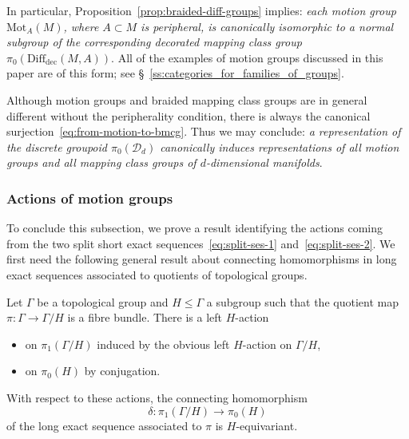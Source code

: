 \documentclass[AHL,Unicode,published]{cedram}
\newcommand{\Mot}{\mathrm{Mot}}
\newcommand{\rdec}{\mathrm{dec}}
\newcommand{\cD}{\mathcal{D}}
\newcommand{\diffdec}{\ensuremath{\mathrm{Diff}_{\rdec}}}
\renewcommand{\leq}{\leqslant}
\begin{document}
\begin{rema}[{Globality}]\label{rmk:globality}
In particular, Proposition~\ref{prop:braided-diff-groups} implies: \emph{each motion group $\Mot_{A}(M)$, where $A \subset M$ is peripheral, is canonically isomorphic to a normal subgroup of the corresponding decorated mapping class group $\pi_{0}(\diffdec(M,A))$}. All of the examples of motion groups discussed in this paper are of this form; see \S~\ref{ss:categories_for_families_of_groups}.

Although motion groups and braided mapping class groups are in general different without the peripherality condition, there is always the canonical surjection~\eqref{eq:from-motion-to-bmcg}. Thus we may conclude: \emph{a representation of the discrete groupoid $\pi_{0}(\cD_{d})$ canonically induces representations of all motion groups and all mapping class groups of $d$-dimensional manifolds}.
\end{rema}


\subsubsection{Actions of motion groups}\label{sss:actions}

To conclude this subsection, we prove a result identifying the actions coming from the two split short exact sequences~\eqref{eq:split-ses-1} and~\eqref{eq:split-ses-2}. We first need the following general result about connecting homomorphisms in long exact sequences associated to quotients of topological groups.

\begin{prop}\label{prop:equivariant-connecting-homomorphism}
Let $\Gamma$ be a topological group and $H \leq \Gamma$ a subgroup such that the quotient map $\pi \colon \Gamma \to \Gamma/H$ is a fibre bundle. There is a left $H$-action
\begin{itemize}
\item on $\pi_{1}(\Gamma/H)$ induced by the obvious left $H$-action on $\Gamma/H$,
\item on $\pi_{0}(H)$ by conjugation.
\end{itemize}
With respect to these actions, the connecting homomorphism
\begin{equation}\label{eq:conecting-homomorphism}
\delta \colon \pi_{1}(\Gamma/H) \longrightarrow \pi_{0}(H)
\end{equation}
of the long exact sequence associated to $\pi$ is $H$-equivariant.
\end{prop}
\end{document}
